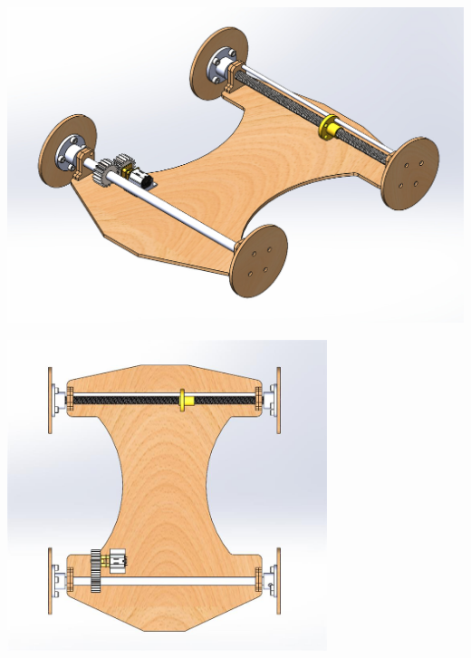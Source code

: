 \documentclass{article}
\begin{document}
\begin{minipage}{0.3\textwidth}
	\centering
	\includegraphics[width=1\textwidth]{extracted_images2/image(2).png}
\end{minipage}\hfill
\begin{minipage}{0.3\textwidth}
	\centering
	\includegraphics[width=0.7\textwidth]{extracted_images2/image.jpg}
\end{minipage}\hfill
\end{document}
